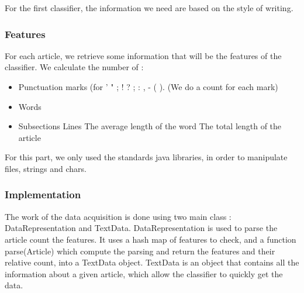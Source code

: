 For the first classifier, the information we need are based on the style of writing.

\subsubsection{Features}
\label{lab:data1}
For each article, we retrieve some information that will be the features of the classifier. We calculate the number of : 
\begin{itemize}
	\item Punctuation marks (for ' " ; ! ? ; : , - ( ). (We do a count for each mark)
	\item Words
	\item Subsections
	\line Lines
	\line The average length of the word
	\line The total length of the article
\end{itemize}

For this part, we only used the standards java libraries, in order to manipulate files, strings and chars. 

\subsubsection{Implementation}

The work of the data acquisition is done using two main class : DataRepresentation and TextData.
DataRepresentation is used to parse the article count the features. It uses a hash map of features to check, and a function parse(Article) which compute the parsing and return the features and their relative count, into a TextData object.
TextData is an object that contains all the information about a given article, which allow the classifier to quickly get the data. 

